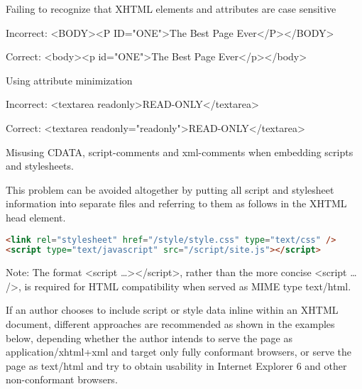 \begin{compactitem}
\item Failing to recognize that XHTML elements and attributes are case sensitive

	\begin{compactitem}
	\item Incorrect: <BODY><P ID="ONE">The Best Page Ever</P></BODY>
	\item Correct: <body><p id="ONE">The Best Page Ever</p></body>
	\end{compactitem}
	
\item Using attribute minimization
	
	\begin{compactitem}
	\item Incorrect: <textarea readonly>READ-ONLY</textarea>
	\item Correct: <textarea readonly="readonly">READ-ONLY</textarea>
	\end{compactitem}
	
\item Misusing CDATA, script-comments and xml-comments when embedding scripts and stylesheets.

	\begin{compactitem}
	\item This problem can be avoided altogether by putting all script and stylesheet information into separate files and referring to them as follows in the XHTML head element.
	\noindent\begin{lstlisting}[language=HTML]
<link rel="stylesheet" href="/style/style.css" type="text/css" />
<script type="text/javascript" src="/script/site.js"></script>
	\end{lstlisting}
	
	Note: The format <script …></script>, rather than the more concise <script … />, is required for HTML compatibility when served as MIME type text/html.

	\item If an author chooses to include script or style data inline within an XHTML document, different approaches are recommended as shown in the examples below, depending whether the author intends to serve the page as application/xhtml+xml and target only fully conformant browsers, or serve the page as text/html and try to obtain usability in Internet Explorer 6 and other non-conformant browsers.
	\end{compactitem}

\end{compactitem}





